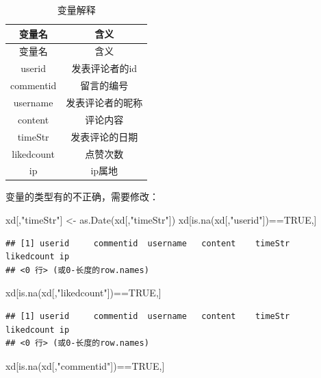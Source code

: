 \documentclass[
]{article}
\newenvironment{Shaded}{\begin{snugshade}}{\end{snugshade}}
\newcommand{\ConstantTok}[1]{\textcolor[rgb]{0.00,0.00,0.00}{#1}}
\newcommand{\FunctionTok}[1]{\textcolor[rgb]{0.00,0.00,0.00}{#1}}
\newcommand{\NormalTok}[1]{#1}
\newcommand{\OtherTok}[1]{\textcolor[rgb]{0.56,0.35,0.01}{#1}}
\newcommand{\SpecialCharTok}[1]{\textcolor[rgb]{0.00,0.00,0.00}{#1}}
\newcommand{\StringTok}[1]{\textcolor[rgb]{0.31,0.60,0.02}{#1}}
\begin{document}
\begin{longtable}[]{@{}cc@{}}
\caption{变量解释}\tabularnewline
\toprule()
变量名 & 含义 \\
\midrule()
\endfirsthead
\toprule()
变量名 & 含义 \\
\midrule()
\endhead
userid & 发表评论者的id \\
commentid & 留言的编号 \\
username & 发表评论者的昵称 \\
content & 评论内容 \\
timeStr & 发表评论的日期 \\
likedcount & 点赞次数 \\
ip & ip属地 \\
\bottomrule()
\end{longtable}

变量的类型有的不正确，需要修改：

\begin{Shaded}
\begin{Highlighting}[]
\NormalTok{xd[,}\StringTok{"timeStr"}\NormalTok{] }\OtherTok{\textless{}{-}} \FunctionTok{as.Date}\NormalTok{(xd[,}\StringTok{"timeStr"}\NormalTok{])}
\NormalTok{xd[}\FunctionTok{is.na}\NormalTok{(xd[,}\StringTok{"userid"}\NormalTok{])}\SpecialCharTok{==}\ConstantTok{TRUE}\NormalTok{,]}
\end{Highlighting}
\end{Shaded}

\begin{verbatim}
## [1] userid     commentid  username   content    timeStr    likedcount ip        
## <0 行> (或0-长度的row.names)
\end{verbatim}

\begin{Shaded}
\begin{Highlighting}[]
\NormalTok{xd[}\FunctionTok{is.na}\NormalTok{(xd[,}\StringTok{"likedcount"}\NormalTok{])}\SpecialCharTok{==}\ConstantTok{TRUE}\NormalTok{,]}
\end{Highlighting}
\end{Shaded}

\begin{verbatim}
## [1] userid     commentid  username   content    timeStr    likedcount ip        
## <0 行> (或0-长度的row.names)
\end{verbatim}

\begin{Shaded}
\begin{Highlighting}[]
\NormalTok{xd[}\FunctionTok{is.na}\NormalTok{(xd[,}\StringTok{"commentid"}\NormalTok{])}\SpecialCharTok{==}\ConstantTok{TRUE}\NormalTok{,]}
\end{Highlighting}
\end{Shaded}
\end{document}
